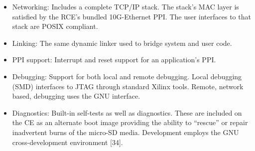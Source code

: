 \begin{itemize}
\item Networking: Includes a complete TCP/IP stack. The stack's MAC layer is satisfied by the RCE's bundled 10G-Ethernet PPI. The user interfaces to that stack are POSIX compliant.
\item Linking: The same dynamic linker used to bridge system and user code.
\item PPI support: Interrupt and reset support for an application's PPI.
\item Debugging: Support for both local and remote debugging. Local debugging (SMD) interfaces to JTAG through standard Xilinx tools. Remote, network based, debugging uses the GNU interface.
\item Diagnostics: Built-in self-tests as well as diagnostics. These are included on the CE as an alternate boot image providing the ability to “rescue” or repair inadvertent burns of the micro-SD media.  Development employs the GNU cross-development environment [34].
\end{itemize}



